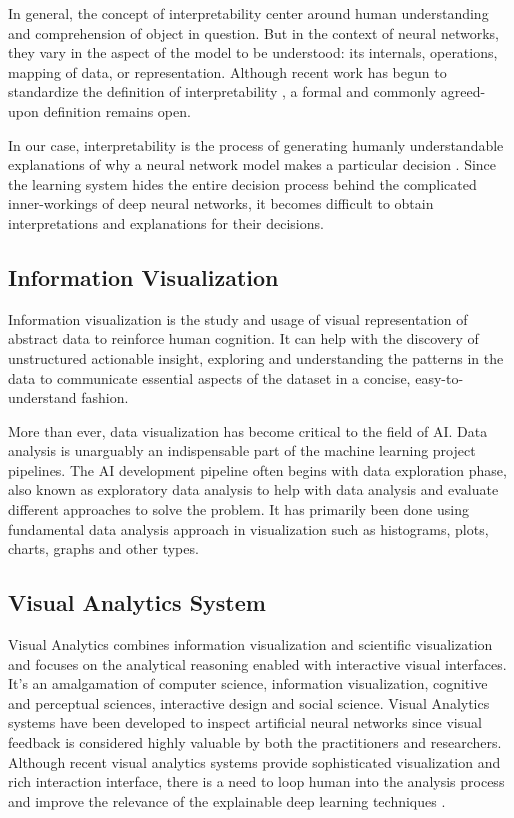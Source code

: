 In general, the concept of interpretability center around human understanding and comprehension of object in question. But in the context of neural networks, they vary in the aspect of the model to be understood: its internals, operations, mapping of data, or representation. Although recent work has begun to standardize the definition of interpretability \cite{Lipton2018}, a formal and commonly agreed-upon definition remains open.
    
In our case, interpretability is the process of generating humanly understandable explanations of why a neural network model makes a particular decision \cite{Sacha2017}. Since the learning system hides the entire decision process behind the complicated inner-workings of deep neural networks, it becomes difficult to obtain interpretations and explanations for their decisions.

\subsection{Information Visualization}

Information visualization is the study and usage of visual representation of abstract data to reinforce human cognition. It can help with the discovery of unstructured actionable insight, exploring and understanding the patterns in the data to communicate essential aspects of the dataset in a concise, easy-to-understand fashion.

More than ever, data visualization has become critical to the field of AI. Data analysis is unarguably an indispensable part of the machine learning project pipelines. The AI development pipeline often begins with data exploration phase, also known as exploratory data analysis to help with data analysis and evaluate different approaches to solve the problem. It has primarily been done using fundamental data analysis approach in visualization such as histograms, plots, charts, graphs and other types.

\subsection{Visual Analytics System}
    
Visual Analytics combines information visualization and scientific visualization and focuses on the analytical reasoning enabled with interactive visual interfaces. It’s an amalgamation of computer science, information visualization, cognitive and perceptual sciences, interactive design and social science. Visual Analytics systems have been developed to inspect artificial neural networks since visual feedback is considered highly valuable by both the practitioners and researchers. Although recent visual analytics systems provide sophisticated visualization and rich interaction interface, there is a need to loop human into the analysis process and improve the relevance of the explainable deep learning techniques \cite{Choo2018}.

